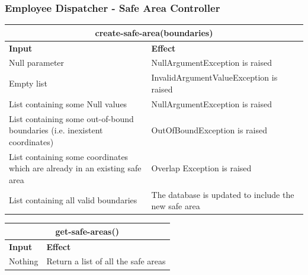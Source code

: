 \documentclass{article}
\begin{document}
\subsubsection{Employee Dispatcher - Safe Area Controller}
\begin{tabular}{ |p{5cm}|p{7cm}| }
  \hline
  \multicolumn{2}{|c|}{create-safe-area(boundaries)} \\
  \hline
  \textbf{Input} & \textbf{Effect} \\
  \hline
  Null parameter & NullArgumentException is raised\\
  \hline
  Empty list & InvalidArgumentValueException is raised\\
  \hline
  List containing some Null values & NullArgumentException is raised\\
  \hline
  List containing some out-of-bound boundaries (i.e. inexistent coordinates) & OutOfBoundException is raised\\
  \hline
  List containing some coordinates which are already in an existing safe area & Overlap Exception is raised\\
  \hline
  List containing all valid boundaries & The database is updated to include the new safe area\\
  \hline
\end{tabular}
\newline
\begin{tabular}{ |p{5cm}|p{7cm}| }
  \hline
  \multicolumn{2}{|c|}{get-safe-areas()} \\
  \hline
  \textbf{Input} & \textbf{Effect} \\
  \hline
  Nothing & Return a list of all the safe areas\\
  \hline
\end{tabular}
\end{document}
